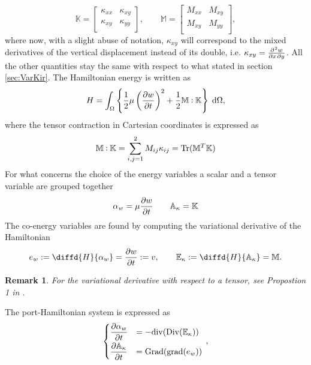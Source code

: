 \documentclass[preprint,12pt]{elsarticle}
\DeclareMathOperator{\Tr}{Tr}
\newtheorem{remark}{Remark}
\def\onedot{$\mathsurround0pt\ldotp$}
\def\cddot{%
	\mathbin{\vcenter{\baselineskip.67ex
			\hbox{\onedot}\hbox{\onedot}}%
}}
\begin{document}
	\begin{equation}
	\mathbb{K} = 
	\begin{bmatrix}
	\kappa_{xx} &  \kappa_{xy}\\
	\kappa_{xy} & \kappa_{yy} \\
	\end{bmatrix}, \qquad
	\mathbb{M} =
	\begin{bmatrix}
	M_{xx} & M_{xy} \\
	M_{xy} & M_{yy} \\
	\end{bmatrix},
	\end{equation}
	where now, with a slight abuse of notation, $\kappa_{xy}$ will correspond to the mixed derivatives of the vertical displacement instead of its double, i.e. $\kappa_{xy} =\diffp{w}{x,y}$. All the other quantities stay the same with respect to what stated in section \ref{sec:VarKir}. 	The Hamiltonian energy is written as
	\begin{equation}
	H = \int_{\Omega} \left\{ \frac{1}{2} \mu \left(\diffp{w}{t} \right)^2 + \frac{1}{2} \mathbb{M} \cddot \mathbb{K}  \right\}  \d{\Omega} ,
	\end{equation}
	where the tensor contraction in Cartesian coordinates is expressed as
	\[\mathbb{M} \cddot \mathbb{K} = \sum_{i,j = 1}^{2} M_{ij} \kappa_{ij} = \Tr(\mathbb{M}^T \mathbb{K}) \]
	For what concerns the choice of the energy variables a scalar and a tensor variable are grouped together
	\begin{equation}
	\alpha_w = \mu \diffp{w}{t} \qquad \mathbb{A}_{\kappa} = \mathbb{K} 	\end{equation}
	The co-energy variables are found by computing the variational derivative of the Hamiltonian
	\begin{equation}
	e_w := \diffd{H}{\alpha_w} = \diffp{w}{t} := v,  \qquad  \mathbb{E}_{\kappa} := \diffd{H}{\mathbb{A}_{\kappa}} = \mathbb{M}.
	\end{equation}
	\begin{remark}
	For the variational derivative with respect to a tensor, see Propostion 1 in \cite{BrugnoliMin}.
	\end{remark}
	The port-Hamiltonian system is expressed as
	\begin{equation}
	\label{eq:PH_sys_Kir_Ten_pr}
	\begin{cases}
	\displaystyle\diffp{\alpha_w}{t} &= - \mathrm{div}(\mathrm{Div}(\mathbb{E}_{\kappa})) \vspace{1mm} \\
	\displaystyle\diffp{\mathbb{A}_{\kappa}}{t} &= \mathrm{Grad}(\mathrm{grad}(e_w))
	\end{cases} \, ,
	\end{equation}
	
\end{document}
